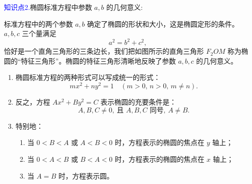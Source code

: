 \documentclass{article}
\begin{document}
\textcolor{blue}{知识点2.}椭圆标准方程中参数 \(a,b\) 的几何意义:
\vspace{1\baselineskip}

标准方程中的两个参数 \(a,b\) 确定了椭圆的形状和大小，这是椭圆定形的条件。\(a,b,c\) 三个量满足
\[
a^2 = b^2 + c^2,
\]
恰好是一个直角三角形的三条边长，我们把如图所示的直角三角形 \(F_2OM\) 称为椭圆的“特征三角形”。椭圆的特征三角形清晰地反映了参数 \(a,b,c\) 的几何意义。

\centering
{}

\begin{tcolorbox}[colback=blue!10,colframe=blue!70!black,title=椭圆的一般方程]

\begin{enumerate}
    \item 椭圆标准方程的两种形式可以写成统一的形式：
    \[
    mx^2 + ny^2 = 1 \quad (m > 0,\,n > 0,\,m \neq n).
    \]
    \item 反之，方程 \(Ax^2 + By^2 = C\) 表示椭圆的充要条件是：
    \[
    A,B,C \neq 0,\ \text{且 } A,B,C \text{ 同号},\ A \neq B.
    \]
    \item 特别地：
    \begin{enumerate}
        \item 当 \(0 < B < A\) 或 \(A < B < 0\) 时，方程表示的椭圆的焦点在 \(y\) 轴上；
        \item 当 \(0 < A < B\) 或 \(B < A < 0\) 时，方程表示的椭圆的焦点在 \(x\) 轴上；
        \item 当 \(A = B\) 时，方程表示圆。
    \end{enumerate}
\end{enumerate}
\end{tcolorbox}
\par          %
\centering    %
\raggedright  %
\vspace{2\baselineskip} 
\end{document}
